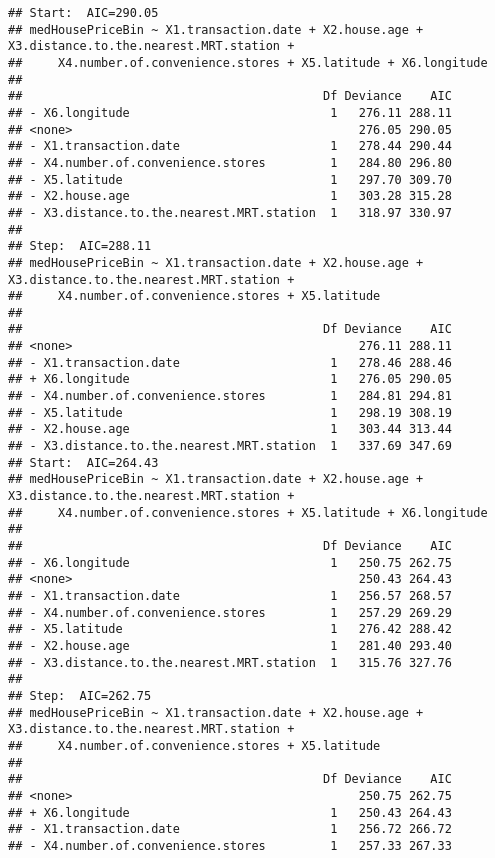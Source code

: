 \documentclass[
]{article}
\begin{document}
\begin{verbatim}
## Start:  AIC=290.05
## medHousePriceBin ~ X1.transaction.date + X2.house.age + X3.distance.to.the.nearest.MRT.station + 
##     X4.number.of.convenience.stores + X5.latitude + X6.longitude
## 
##                                          Df Deviance    AIC
## - X6.longitude                            1   276.11 288.11
## <none>                                        276.05 290.05
## - X1.transaction.date                     1   278.44 290.44
## - X4.number.of.convenience.stores         1   284.80 296.80
## - X5.latitude                             1   297.70 309.70
## - X2.house.age                            1   303.28 315.28
## - X3.distance.to.the.nearest.MRT.station  1   318.97 330.97
## 
## Step:  AIC=288.11
## medHousePriceBin ~ X1.transaction.date + X2.house.age + X3.distance.to.the.nearest.MRT.station + 
##     X4.number.of.convenience.stores + X5.latitude
## 
##                                          Df Deviance    AIC
## <none>                                        276.11 288.11
## - X1.transaction.date                     1   278.46 288.46
## + X6.longitude                            1   276.05 290.05
## - X4.number.of.convenience.stores         1   284.81 294.81
## - X5.latitude                             1   298.19 308.19
## - X2.house.age                            1   303.44 313.44
## - X3.distance.to.the.nearest.MRT.station  1   337.69 347.69
## Start:  AIC=264.43
## medHousePriceBin ~ X1.transaction.date + X2.house.age + X3.distance.to.the.nearest.MRT.station + 
##     X4.number.of.convenience.stores + X5.latitude + X6.longitude
## 
##                                          Df Deviance    AIC
## - X6.longitude                            1   250.75 262.75
## <none>                                        250.43 264.43
## - X1.transaction.date                     1   256.57 268.57
## - X4.number.of.convenience.stores         1   257.29 269.29
## - X5.latitude                             1   276.42 288.42
## - X2.house.age                            1   281.40 293.40
## - X3.distance.to.the.nearest.MRT.station  1   315.76 327.76
## 
## Step:  AIC=262.75
## medHousePriceBin ~ X1.transaction.date + X2.house.age + X3.distance.to.the.nearest.MRT.station + 
##     X4.number.of.convenience.stores + X5.latitude
## 
##                                          Df Deviance    AIC
## <none>                                        250.75 262.75
## + X6.longitude                            1   250.43 264.43
## - X1.transaction.date                     1   256.72 266.72
## - X4.number.of.convenience.stores         1   257.33 267.33

\end{verbatim}
\end{document}
